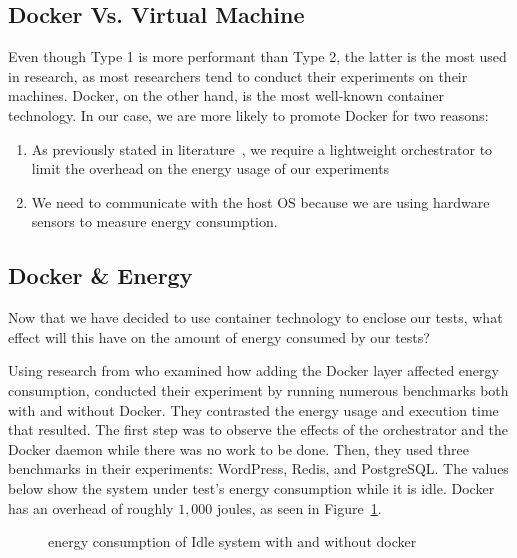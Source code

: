 \subsection{Docker Vs. Virtual Machine}
Even though Type 1 is more performant than Type 2, the latter is the most used in research, as most researchers tend to conduct their experiments on their machines. Docker, on the other hand, is the most well-known container technology. In our case, we are more likely to promote Docker for two reasons:
\begin{enumerate}
    \item As previously stated in literature~\cite{van2016power,morabito_power_2015}, we require a lightweight orchestrator to limit the overhead on the energy usage of our experiments
    \item We need to communicate with the host OS because we are using hardware sensors to measure energy consumption.
\end{enumerate}



\subsection{Docker \& Energy}
Now that we have decided to use container technology to enclose our tests, what effect will this have on the amount of energy consumed by our tests?


Using research from \cite{eddie_antonio_santos_how} who examined how adding the Docker layer affected energy consumption, \citeauthor{eddie_antonio_santos_how} conducted their experiment by running numerous benchmarks both with and without Docker. They contrasted the energy usage and execution time that resulted.
The first step was to observe the effects of the orchestrator and the Docker daemon while there was no work to be done.
Then, they used three benchmarks in their experiments: WordPress, Redis, and PostgreSQL.
The values below show the system under test's energy consumption while it is idle.
Docker has an overhead of roughly $1,000$  joules, as seen in Figure~\ref{fig:docker_idle}.


\begin{figure}
    \caption{energy consumption of Idle system with and without docker \cite{eddie_antonio_santos_how}}\label{fig:docker_idle}
\end{figure}

